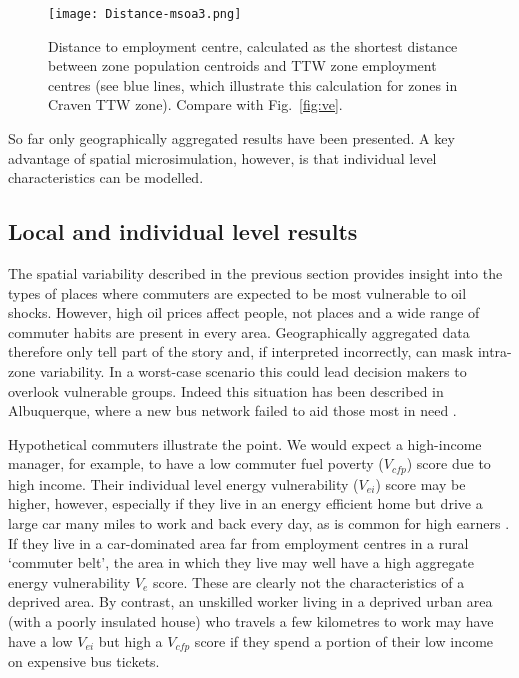 \begin{figure}[h]
 \centering
   \texttt{[image: Distance-msoa3.png]}
 \caption[Distance to employment centre from zone centroids]{Distance to
employment centre, calculated as the shortest distance
between zone population centroids and TTW zone employment centres (see
blue lines, which illustrate this calculation for zones in Craven TTW zone).
 Compare with Fig.~\ref{fig:ve}.}
 \label{fig:mapttw}
\end{figure}

So far only geographically aggregated results have been presented.
A key advantage of spatial microsimulation, however, is that individual level
characteristics can be modelled.

\subsection{Local and individual level results}
\label{s:indresults}
The spatial variability described in the previous section
provides insight into the types of places
where commuters are expected to be most vulnerable to oil shocks.
However, high oil prices affect people, not places and a wide range of
commuter habits are present in every area. Geographically
aggregated data therefore only tell part of the story and, if
interpreted incorrectly, can mask intra-zone variability.
In a worst-case scenario this could lead decision makers to
overlook vulnerable groups. Indeed this situation has been described
in Albuquerque, where a new bus network failed to
aid those most in need \citep{Tribby2012}.

Hypothetical commuters illustrate the point. We would expect a
high-income manager, for example, to have a low commuter fuel poverty
($V_{cfp}$)
score due to high income. Their individual level energy vulnerability ($V_{ei}$)
score may be higher, however,
especially if they live in an energy efficient home but drive a large car
many miles to work and back every day, as is common for high earners
\citep{Green-1999-ld-commute}. If they live in a car-dominated area far from
employment centres in a rural `commuter belt', the area in which they live
may well have a high aggregate energy vulnerability $V_e$ score. These
are clearly not the characteristics of a deprived area.
By contrast, an unskilled worker living in a deprived urban area (with a poorly
insulated house) who travels a few kilometres to work may have have a low
$V_{ei}$ but high a $V_{cfp}$ score if they spend
a portion of their low income on expensive bus tickets.

